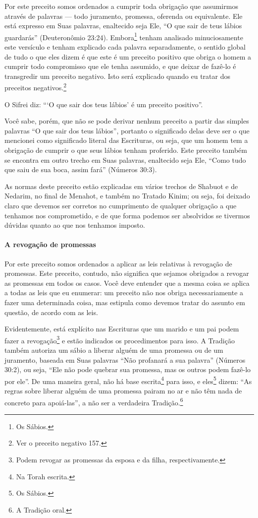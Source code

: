Por este preceito somos ordenados a cumprir toda obrigação que
assumirmos através de palavras --- todo juramento, promessa, oferenda ou
equivalente. Ele está expresso em Suas palavras, enaltecido seja Ele, ``O
que sair de teus lábios guardarás'' (Deuteronômio 23:24).
Embora\footnote{Os Sábios.} tenham analisado minuciosamente este versículo e tenham explicado cada palavra separadamente,
o sentido global de tudo o que eles dizem é que este é um preceito
positivo que obriga o homem a cumprir todo compromisso que ele tenha
assumido, e que deixar de fazê-lo é transgredir um preceito negativo.
Isto será explicado quando eu tratar dos preceitos
negativos.\footnote{Ver o preceito negativo 157.}

O Sifrei diz: ```O que sair dos teus lábios' é um preceito positivo''.

Você sabe, porém, que não se pode derivar nenhum preceito a partir das
simples palavras ``O que sair dos teus lábios'', portanto o significado
delas deve ser o que mencionei como significado literal das Escrituras,
ou seja, que um homem tem a obrigação de cumprir o que seus lábios
tenham proferido. Este preceito também se encontra em outro trecho em
Suas palavras, enaltecido seja Ele, ``Como tudo que saiu de sua boca,
assim fará'' (Números 30:3).

As normas deste preceito estão explicadas em vários trechos de Shabuot
e de Nedarim, no final de Menahot, e também no Tratado Kinim; ou seja,
foi deixado claro que devemos ser corretos no cumprimento de qualquer
obrigação a que tenhamos nos comprometido, e de que forma podemos ser
absolvidos se tivermos dúvidas quanto ao que nos tenhamos imposto.

\paragraph{A revogação de promessas}

Por este preceito somos ordenados a aplicar as leis relativas à
revogação de promessas. Este preceito, contudo, não significa que
sejamos obrigados a revogar as promessas em todos os casos. Você deve
entender que a mesma coisa se aplica a todas as leis que eu enumerar:
um preceito não nos obriga necessariamente a fazer uma determinada
coisa, mas estipula como devemos tratar do assunto em questão, de acordo
com as leis.

Evidentemente, está explícito nas Escrituras que um marido e um pai
podem fazer a revogação\footnote{Podem revogar as promessas da esposa e da filha, respectivamente.} e estão indicados os
procedimentos para isso. A Tradição também autoriza um sábio a liberar alguém de uma promessa ou de um
juramento, baseada em Suas palavras ``Não profanará a sua palavra''
(Números 30:2), ou seja, ``Ele não pode quebrar sua promessa, mas os outros podem
fazê-lo por ele''. De uma maneira geral, não há base
escrita\footnote{Na Torah escrita.} para isso, e eles\footnote{Os Sábios.} dizem: ``As regras sobre liberar alguém de uma promessa pairam no ar e não têm
nada de concreto para apoiá-las'', a não ser a verdadeira
Tradição.\footnote{A Tradição oral.}


